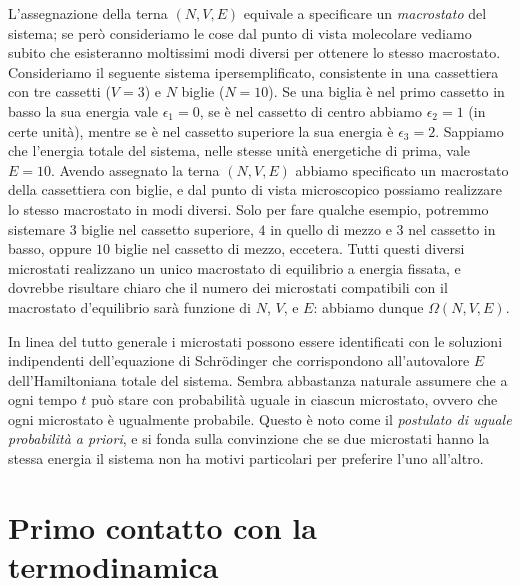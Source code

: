 L'assegnazione della terna $(N,V,E)$ equivale a specificare un {\em macrostato} del sistema; se però consideriamo le cose dal punto di vista molecolare vediamo subito che esisteranno moltissimi modi diversi per ottenere lo stesso macrostato. Consideriamo il seguente sistema ipersemplificato, consistente in una cassettiera con tre cassetti ($V=3$) e $N$ biglie ($N = 10$). Se una biglia è nel primo cassetto in basso la sua energia vale $\epsilon_{1} = 0$, se è nel cassetto di centro abbiamo $\epsilon_{2} = 1$ (in certe unità), mentre se è nel cassetto superiore la sua energia è $\epsilon_{3} = 2$. Sappiamo che l'energia totale del sistema, nelle stesse unità energetiche di prima, vale $E = 10$. Avendo assegnato la terna $(N,V,E)$ abbiamo specificato un macrostato della cassettiera con biglie, e dal punto di vista microscopico possiamo realizzare lo stesso macrostato in modi diversi. Solo per fare qualche esempio, potremmo sistemare $3$ biglie nel cassetto superiore, $4$ in quello di mezzo e $3$ nel cassetto in basso, oppure $10$ biglie nel cassetto di mezzo, eccetera. Tutti questi diversi microstati realizzano un unico macrostato di equilibrio a energia fissata, e dovrebbe risultare chiaro che il numero dei microstati compatibili con il macrostato d'equilibrio sarà funzione di $N$, $V$, e $E$: abbiamo dunque $\Omega(N,V,E)$.

In linea del tutto generale i microstati possono essere identificati con le soluzioni indipendenti dell'equazione di Schr\"odinger che corrispondono all'autovalore $E$ dell'Hamiltoniana totale del sistema. Sembra abbastanza naturale assumere che a ogni tempo $t$ può stare con probabilità uguale in ciascun microstato, ovvero che ogni microstato è ugualmente probabile. Questo è noto come il {\em postulato di uguale probabilità a priori}, e si fonda sulla convinzione che se due microstati hanno la stessa energia il sistema non ha motivi particolari per preferire l'uno all'altro. 

%
\section{Primo contatto con la termodinamica}
\label{sec:02-primo}

